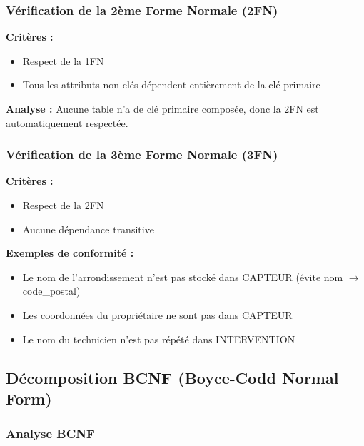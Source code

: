 \documentclass[12pt,a4paper]{article}
\begin{document}
\subsubsection{Vérification de la 2ème Forme Normale (2FN)}

\textbf{Critères :}
\begin{itemize}
    \item[$\checkmark$] Respect de la 1FN
    \item[$\checkmark$] Tous les attributs non-clés dépendent entièrement de la clé primaire
\end{itemize}

\textbf{Analyse :} Aucune table n'a de clé primaire composée, donc la 2FN est automatiquement respectée.

\subsubsection{Vérification de la 3ème Forme Normale (3FN)}

\textbf{Critères :}
\begin{itemize}
    \item[$\checkmark$] Respect de la 2FN
    \item[$\checkmark$] Aucune dépendance transitive
\end{itemize}

\textbf{Exemples de conformité :}
\begin{itemize}
    \item Le nom de l'arrondissement n'est pas stocké dans CAPTEUR (évite nom $\rightarrow$ code\_postal)
    \item Les coordonnées du propriétaire ne sont pas dans CAPTEUR
    \item Le nom du technicien n'est pas répété dans INTERVENTION
\end{itemize}

\begin{center}
\end{center}

\subsection{Décomposition BCNF (Boyce-Codd Normal Form)}

\subsubsection{Analyse BCNF}
\end{document}
